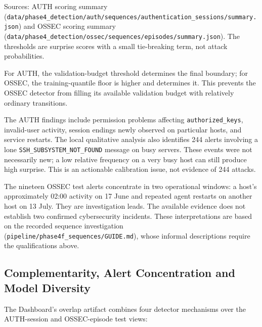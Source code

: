 \documentclass[11pt,a4paper]{article}
\newcommand{\projectref}[2]{#1 {\footnotesize(\nolinkurl{#2})}}
\begin{document}
Sources: AUTH \projectref{scoring summary}{data/phase4_detection/auth/sequences/authentication_sessions/summary.json} and OSSEC \projectref{scoring summary}{data/phase4_detection/ossec/sequences/episodes/summary.json}. The thresholds are surprise scores with a small tie-breaking term, not attack probabilities.

For AUTH, the validation-budget threshold determines the final boundary; for OSSEC, the training-quantile floor is higher and determines it. This prevents the OSSEC detector from filling its available validation budget with relatively ordinary transitions.

The AUTH findings include permission problems affecting \nolinkurl{authorized_keys}, invalid-user activity, session endings newly observed on particular hosts, and service restarts. The local qualitative analysis also identifies 244 alerts involving a lone \nolinkurl{SSH_SUBSYSTEM_NOT_FOUND} message on busy servers. These events were not necessarily new; a low relative frequency on a very busy host can still produce high surprise. This is an actionable calibration issue, not evidence of 244 attacks.

The nineteen OSSEC test alerts concentrate in two operational windows: a host's approximately 02:00 activity on 17 June and repeated agent restarts on another host on 13 July. They are investigation leads. The available evidence does not establish two confirmed cybersecurity incidents. These interpretations are based on the \projectref{recorded sequence investigation}{pipeline/phase4f_sequences/GUIDE.md}, whose informal descriptions require the qualifications above.

\subsection{Complementarity, Alert Concentration and Model Diversity}\label{sec:complementarity}

The Dashboard's overlap artifact combines four detector mechanisms over the AUTH-session and OSSEC-episode test views:
\end{document}
